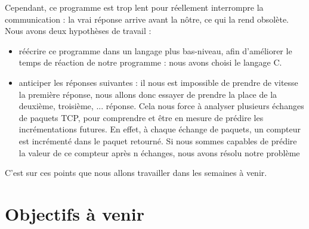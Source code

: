 \documentclass[a4paper, 12pt,twoside]{article}
\begin{document}
	Cependant, ce programme est trop lent pour réellement interrompre la communication : la vrai réponse arrive avant la nôtre, ce qui la rend obsolète. Nous avons deux hypothèses de travail : \begin{itemize}[label=\color{bleu303}\textbullet{}]
		\item réécrire ce programme dans un langage plus bas-niveau, afin d'améliorer le temps de réaction de notre programme : nous avons choisi le langage C.
		\item anticiper les réponses suivantes : il nous est impossible de prendre de vitesse la première réponse, nous allons donc essayer de prendre la place de la deuxième, troisième, ... réponse. Cela nous force à analyser plusieurs échanges de paquets TCP, pour comprendre et être en mesure de prédire les incrémentations futures. En effet, à chaque échange de paquets, un compteur est incrémenté dans le paquet retourné. Si nous sommes capables de prédire la valeur de ce compteur après n échanges, nous avons résolu notre problème
	\end{itemize}
	
	C'est sur ces points que nous allons travailler dans les semaines à venir.

\section{Objectifs à venir}
\end{document}
